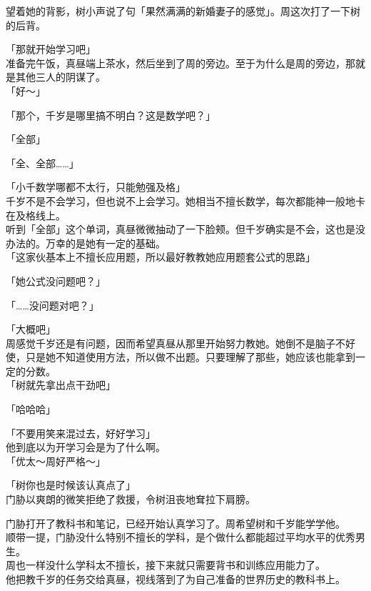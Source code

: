 望着她的背影，树小声说了句「果然满满的新婚妻子的感觉」。周这次打了一下树的后背。\\

\vspace{2\baselineskip}

「那就开始学习吧」\\

准备完午饭，真昼端上茶水，然后坐到了周的旁边。至于为什么是周的旁边，那就是其他三人的阴谋了。\\

「好～」

「那个，千岁是哪里搞不明白？这是数学吧？」

「全部」

「全、全部……」

「小千数学哪都不太行，只能勉强及格」\\

千岁不是不会学习，但也说不上会学习。她相当不擅长数学，每次都能神一般地卡在及格线上。\\

听到「全部」这个单词，真昼微微抽动了一下脸颊。但千岁确实是不会，这也是没办法的。万幸的是她有一定的基础。\\

「这家伙基本上不擅长应用题，所以最好教教她应用题套公式的思路」

「她公式没问题吧？」

「……没问题对吧？」

「大概吧」\\

周感觉千岁还是有问题，因而希望真昼从那里开始努力教她。她倒不是脑子不好使，只是她不知道使用方法，所以做不出题。只要理解了那些，她应该也能拿到一定的分数。\\

「树就先拿出点干劲吧」

「哈哈哈」

「不要用笑来混过去，好好学习」\\

他到底以为开学习会是为了什么啊。\\

「优太～周好严格～」

「树你也是时候该认真点了」\\

门胁以爽朗的微笑拒绝了救援，令树沮丧地耷拉下肩膀。

门胁打开了教科书和笔记，已经开始认真学习了。周希望树和千岁能学学他。\\

顺带一提，门胁没什么特别不擅长的学科，是个做什么都能超过平均水平的优秀男生。\\

周也一样没什么学科太不擅长，接下来就只需要背书和训练应用能力了。\\

他把教千岁的任务交给真昼，视线落到了为自己准备的世界历史的教科书上。
